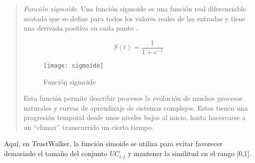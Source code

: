 			\begin{quote}
				\textit{Función sigmoide}. Una función sigmoide es una función real diferenciable acotada que se define para todos los valores reales de las entradas y tiene una derivada positiva en cada punto \cite{han1995}.
				
				\begin{equation}
					S(t) = \frac{1}{1 + e^{-t}}
				\end{equation}
				
				\begin{figure}[h]
					\texttt{[image: sigmoide]}
					\centering
					\caption{Función sigmoide}
				\end{figure}
				
				Esta función permite describir procesos la evolución de muchos procesos naturales y curvas de aprendizaje de sistemas complejos. Estos tienen una progresión temporal desde unos niveles bajos al inicio, hasta hacercarse a un \enquote{climax} transcurrido un cierto tiempo.
			\end{quote}
			
		Aquí, en TrustWalker, la función simoide se utiliza para evitar favorecer demasiado el tamaño del conjunto $UC_{i,j}$ y mantener la similitud en el rango [0,1].
			 